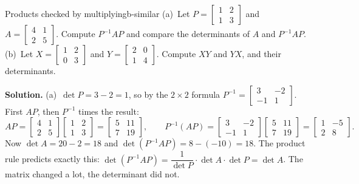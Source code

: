 \documentclass[11pt]{article}
\begin{document}
\begin{exmp}{Products checked by multiplying}{b-similar}
(a)~Let $P=\begin{bmatrix}1&2\\1&3\end{bmatrix}$ and $A=\begin{bmatrix}4&1\\2&5\end{bmatrix}$. Compute $P^{-1}AP$ and compare the determinants of $A$ and $P^{-1}AP$. (b)~Let $X=\begin{bmatrix}1&2\\0&3\end{bmatrix}$ and $Y=\begin{bmatrix}2&0\\1&4\end{bmatrix}$. Compute $XY$ and $YX$, and their determinants.

\textbf{Solution.} (a)~$\det P=3-2=1$, so by the $2\times2$ formula $P^{-1}=\begin{bmatrix}3&-2\\-1&1\end{bmatrix}$. First $AP$, then $P^{-1}$ times the result:
\[
AP=\begin{bmatrix}4&1\\2&5\end{bmatrix}\begin{bmatrix}1&2\\1&3\end{bmatrix}=\begin{bmatrix}5&11\\7&19\end{bmatrix},\qquad
P^{-1}(AP)=\begin{bmatrix}3&-2\\-1&1\end{bmatrix}\begin{bmatrix}5&11\\7&19\end{bmatrix}=\begin{bmatrix}1&-5\\2&8\end{bmatrix}.
\]
Now $\det A=20-2=18$ and $\det(P^{-1}AP)=8-(-10)=18$. The product rule predicts exactly this: $\det(P^{-1}AP)=\dfrac1{\det P}\cdot\det A\cdot\det P=\det A$. The matrix changed a lot, the determinant did not.


\end{exmp}
\end{document}
